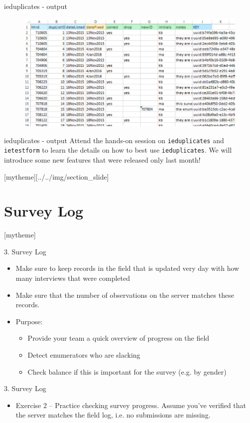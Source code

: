 \documentclass[aspectratio=169]{beamer}
\newcommand{\sectionpic}[2]{
	\setbeamertemplate{section page}[mytheme][#2]
	\section{#1}
	\setbeamertemplate{section page}[mytheme]
}
\begin{document}
\begin{frame}{ieduplicates - output}
	\begin{figure}
		\centering
		\includegraphics[width=.9\linewidth]{img/ieduplicates-output.png}
	\end{figure}
\end{frame}

\begin{frame}{ieduplicates - output}
	Attend the hands-on session on \texttt{ieduplicates} and \texttt{ietestform} to learn the details on how to best use \texttt{ieduplicates}. We will introduce some new features that were released only last month!
\end{frame}

\sectionpic{Survey Log}{../../img/section_slide}



\begin{frame}{3. Survey Log}
	\begin{itemize}
		\item Make sure to keep records in the field that is updated very day with how many interviews that were completed
		\item Make sure that the number of observations on the server matches these records.
		\item Purpose:
		\begin{itemize}
			\item Provide your team a quick overview of progress on the field
			\item Detect enumerators who are slacking
			\item Check balance if this is important for the survey (e.g. by gender)
		\end{itemize}
	\end{itemize}
\end{frame}


\begin{frame}{3. Survey Log}
	\begin{itemize}
		\item Exercise 2 – Practice checking survey progress. Assume you’ve verified that the server matches the field log, i.e. no submissions are missing.
	\end{itemize}
\end{frame}
\end{document}
